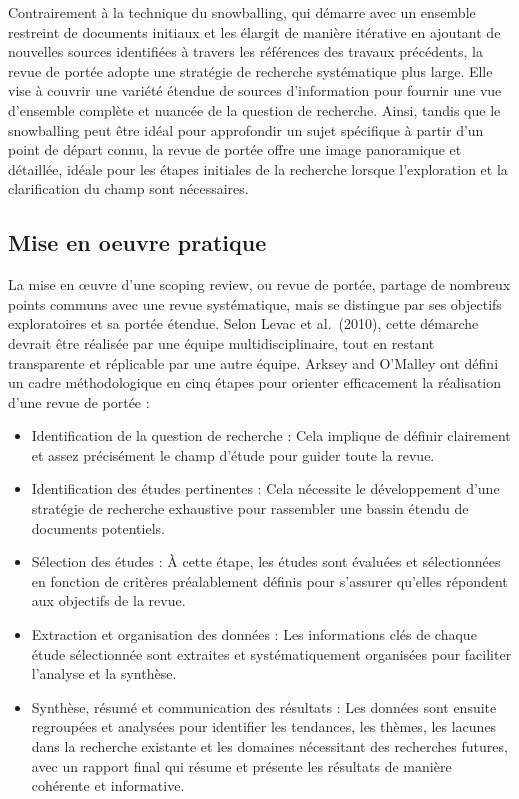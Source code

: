 \documentclass[
  letterpaper,
]{scrbook}
\begin{document}
Contrairement à la technique du snowballing, qui démarre avec un
ensemble restreint de documents initiaux et les élargit de manière
itérative en ajoutant de nouvelles sources identifiées à travers les
références des travaux précédents, la revue de portée adopte une
stratégie de recherche systématique plus large. Elle vise à couvrir une
variété étendue de sources d'information pour fournir une vue d'ensemble
complète et nuancée de la question de recherche. Ainsi, tandis que le
snowballing peut être idéal pour approfondir un sujet spécifique à
partir d'un point de départ connu, la revue de portée offre une image
panoramique et détaillée, idéale pour les étapes initiales de la
recherche lorsque l'exploration et la clarification du champ sont
nécessaires.

\hypertarget{mise-en-oeuvre-pratique}{%
\subsection{Mise en oeuvre pratique}\label{mise-en-oeuvre-pratique}}

La mise en œuvre d'une scoping review, ou revue de portée, partage de
nombreux points communs avec une revue systématique, mais se distingue
par ses objectifs exploratoires et sa portée étendue. Selon Levac et
al.~(2010), cette démarche devrait être réalisée par une équipe
multidisciplinaire, tout en restant transparente et réplicable par une
autre équipe. Arksey and O'Malley ont défini un cadre méthodologique en
cinq étapes pour orienter efficacement la réalisation d'une revue de
portée :

\begin{itemize}
\item
  Identification de la question de recherche : Cela implique de définir
  clairement et assez précisément le champ d'étude pour guider toute la
  revue.
\item
  Identification des études pertinentes : Cela nécessite le
  développement d'une stratégie de recherche exhaustive pour rassembler
  une bassin étendu de documents potentiels.
\item
  Sélection des études : À cette étape, les études sont évaluées et
  sélectionnées en fonction de critères préalablement définis pour
  s'assurer qu'elles répondent aux objectifs de la revue.
\item
  Extraction et organisation des données : Les informations clés de
  chaque étude sélectionnée sont extraites et systématiquement
  organisées pour faciliter l'analyse et la synthèse.
\item
  Synthèse, résumé et communication des résultats : Les données sont
  ensuite regroupées et analysées pour identifier les tendances, les
  thèmes, les lacunes dans la recherche existante et les domaines
  nécessitant des recherches futures, avec un rapport final qui résume
  et présente les résultats de manière cohérente et informative.
\end{itemize}
\end{document}
